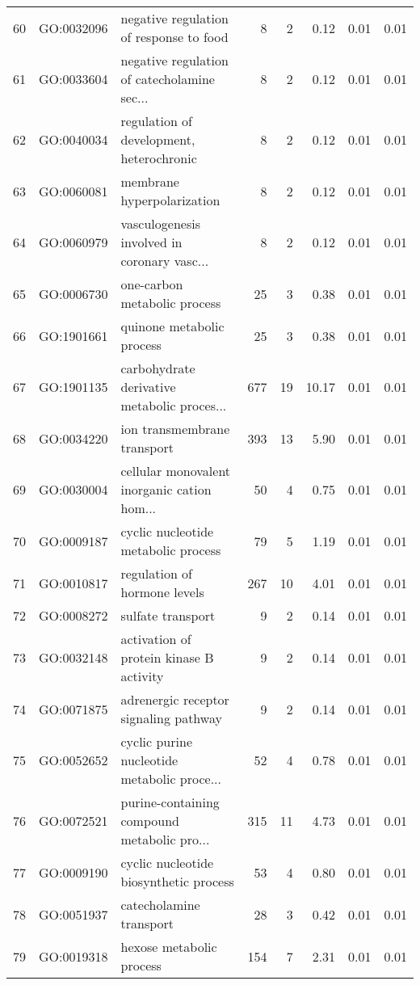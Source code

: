 \begin{table}[ht]
\begin{tabular}{rllrrrrr}
  60 & GO:0032096 & negative regulation of response to food &   8 &   2 & 0.12 & 0.01 & 0.01 \\ 
  61 & GO:0033604 & negative regulation of catecholamine sec... &   8 &   2 & 0.12 & 0.01 & 0.01 \\ 
  62 & GO:0040034 & regulation of development, heterochronic &   8 &   2 & 0.12 & 0.01 & 0.01 \\ 
  63 & GO:0060081 & membrane hyperpolarization &   8 &   2 & 0.12 & 0.01 & 0.01 \\ 
  64 & GO:0060979 & vasculogenesis involved in coronary vasc... &   8 &   2 & 0.12 & 0.01 & 0.01 \\ 
  65 & GO:0006730 & one-carbon metabolic process &  25 &   3 & 0.38 & 0.01 & 0.01 \\ 
  66 & GO:1901661 & quinone metabolic process &  25 &   3 & 0.38 & 0.01 & 0.01 \\ 
  67 & GO:1901135 & carbohydrate derivative metabolic proces... & 677 &  19 & 10.17 & 0.01 & 0.01 \\ 
  68 & GO:0034220 & ion transmembrane transport & 393 &  13 & 5.90 & 0.01 & 0.01 \\ 
  69 & GO:0030004 & cellular monovalent inorganic cation hom... &  50 &   4 & 0.75 & 0.01 & 0.01 \\ 
  70 & GO:0009187 & cyclic nucleotide metabolic process &  79 &   5 & 1.19 & 0.01 & 0.01 \\ 
  71 & GO:0010817 & regulation of hormone levels & 267 &  10 & 4.01 & 0.01 & 0.01 \\ 
  72 & GO:0008272 & sulfate transport &   9 &   2 & 0.14 & 0.01 & 0.01 \\ 
  73 & GO:0032148 & activation of protein kinase B activity &   9 &   2 & 0.14 & 0.01 & 0.01 \\ 
  74 & GO:0071875 & adrenergic receptor signaling pathway &   9 &   2 & 0.14 & 0.01 & 0.01 \\ 
  75 & GO:0052652 & cyclic purine nucleotide metabolic proce... &  52 &   4 & 0.78 & 0.01 & 0.01 \\ 
  76 & GO:0072521 & purine-containing compound metabolic pro... & 315 &  11 & 4.73 & 0.01 & 0.01 \\ 
  77 & GO:0009190 & cyclic nucleotide biosynthetic process &  53 &   4 & 0.80 & 0.01 & 0.01 \\ 
  78 & GO:0051937 & catecholamine transport &  28 &   3 & 0.42 & 0.01 & 0.01 \\ 
  79 & GO:0019318 & hexose metabolic process & 154 &   7 & 2.31 & 0.01 & 0.01 \\ 

\end{tabular}
\end{table}
